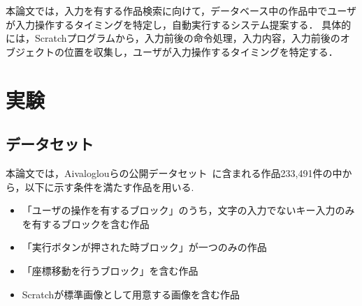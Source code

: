 \documentclass[uplatex,dvipdfmx,a4paper,twocolumn,base=11pt,jbase=11pt,ja=standard]{bxjsarticle}  %
\newcommand{\todo}[1]{\colorbox{yellow}{{\bf TODO}:}{\color{red} {\textbf{[#1]}}}}
\begin{document}

本論文では，入力を有する作品検索に向けて，データベース中の作品中でユーザが入力操作するタイミングを特定し，自動実行するシステム提案する．
具体的には，Scratchプログラムから，入力前後の命令処理，入力内容，入力前後のオブジェクトの位置を収集し，ユーザが入力操作するタイミングを特定する．



\section{実験}


\subsection{データセット}



本論文では，Aivaloglouらの公開データセット~\cite{ICMSR2017_Aivaloglou}に含まれる作品233,491件の中から，以下に示す条件を満たす作品を用いる.
\vspace{-2mm}
\begin{itemize}
 \item 「ユーザの操作を有するブロック」のうち，文字の入力でないキー入力のみを有するブロックを含む作品
 \item 「実行ボタンが押された時ブロック」が一つのみの作品
 \item 「座標移動を行うブロック」を含む作品
 \item Scratchが標準画像として用意する画像を含む作品
\end{itemize}
\end{document}
